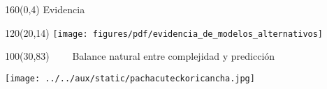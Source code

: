 \documentclass[shownotes,aspectratio=169]{beamer}
\begin{document}
% 
% 
% 
% 
% 
% 
% 
% 
% 
% 
% 
% 
% 



\begin{frame}[plain]
\begin{textblock}{160}(0,4)
\centering \Large  Evidencia
\end{textblock}


 \begin{textblock}{120}(20,14)
  \centering
  \texttt{[image: figures/pdf/evidencia\_de\_modelos\_alternativos]} 
 \end{textblock} 
 
 
 \begin{textblock}{100}(30,83)
  \centering
 \ \ \ \  Balance natural entre complejidad y predicci\'on
  \end{textblock}
\end{frame}


\begin{frame}[plain]

\centering
  \texttt{[image: ../../aux/static/pachacuteckoricancha.jpg]}
\end{frame}
\end{document}
